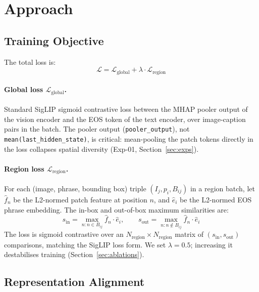 \documentclass{article}
\begin{document}
\section{Approach}
\label{sec:approach}

\subsection{Training Objective}
\label{sec:loss}

The total loss is:
\begin{equation}
\mathcal{L} = \mathcal{L}_{\text{global}} + \lambda \cdot \mathcal{L}_{\text{region}}
\label{eq:loss}
\end{equation}

\paragraph{Global loss $\mathcal{L}_{\text{global}}$.}
Standard SigLIP sigmoid contrastive loss between the MHAP pooler output of the
vision encoder and the EOS token of the text encoder, over image-caption pairs
in the batch.  The pooler output (\texttt{pooler\_output}), not
\texttt{mean(last\_hidden\_state)}, is critical: mean-pooling the patch tokens
directly in the loss collapses spatial diversity (Exp-01, Section~\ref{sec:exps}).

\paragraph{Region loss $\mathcal{L}_{\text{region}}$.}
For each (image, phrase, bounding box) triple $(I_j, p_i, B_{ij})$ in a region
batch, let $\hat{f}_n$ be the L2-normed patch feature at position $n$, and
$\hat{e}_i$ be the L2-normed EOS phrase embedding. The in-box and out-of-box
maximum similarities are:
\begin{equation}
s_{\text{in}} = \max_{n : n \in B_{ij}} \hat{f}_n \cdot \hat{e}_i,
\qquad
s_{\text{out}} = \max_{n : n \notin B_{ij}} \hat{f}_n \cdot \hat{e}_i
\end{equation}
The loss is sigmoid contrastive over an $N_{\text{region}} \times N_{\text{region}}$
matrix of $(s_{\text{in}}, s_{\text{out}})$ comparisons, matching the SigLIP
loss form. We set $\lambda = 0.5$; increasing it destabilises training
(Section~\ref{sec:ablations}).

\subsection{Representation Alignment}
\label{sec:alignment}
\end{document}
